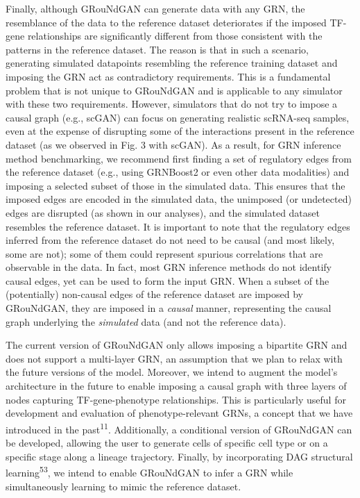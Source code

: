 Finally, although GRouNdGAN can generate data with any GRN, the resemblance of the data to the reference dataset deteriorates if the imposed TF-gene relationships are significantly different from those consistent with the patterns in the reference dataset. The reason is that in such a scenario, generating simulated datapoints resembling the reference training dataset and imposing the GRN act as contradictory requirements. This is a fundamental problem that is not unique to GRouNdGAN and is applicable to any simulator with these two requirements. However, simulators that do not try to impose a causal graph (e.g., scGAN) can focus on generating realistic scRNA-seq samples, even at the expense of disrupting some of the interactions present in the reference dataset (as we observed in Fig. 3 with scGAN). As a result, for GRN inference method benchmarking, we recommend first finding a set of regulatory edges from the reference dataset (e.g., using GRNBoost2 or even other data modalities) and imposing a selected subset of those in the simulated data. This ensures that the imposed edges are encoded in the simulated data, the unimposed (or undetected) edges are disrupted (as shown in our analyses), and the simulated dataset resembles the reference dataset. It is important to note that the regulatory edges inferred from the reference dataset do not need to be causal (and most likely, some are not); some of them could represent spurious correlations that are observable in the data. In fact, most GRN inference methods do not identify causal edges, yet can be used to form the input GRN. When a subset of the (potentially) non-causal edges of the reference dataset are imposed by GRouNdGAN, they are imposed in a \textit{causal} manner, representing the causal graph underlying the \textit{simulated} data (and not the reference data).

The current version of GRouNdGAN only allows imposing a bipartite GRN and does not support a multi-layer GRN, an assumption that we plan to relax with the future versions of the model. Moreover, we intend to augment the model’s architecture in the future to enable imposing a causal graph with three layers of nodes capturing TF-gene-phenotype relationships. This is particularly useful for development and evaluation of phenotype-relevant GRNs, a concept that we have introduced in the past\textsuperscript{11}. Additionally, a conditional version of GRouNdGAN can be developed, allowing the user to generate cells of specific cell type or on a specific stage along a lineage trajectory. Finally, by incorporating DAG structural learning\textsuperscript{53}, we intend to enable GRouNdGAN to infer a GRN while simultaneously learning to mimic the reference dataset.

